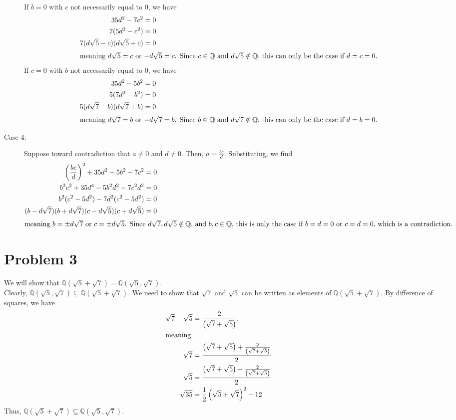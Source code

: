 \documentclass[11pt]{extarticle}
\newcommand{\Q}{\mathbb{Q}}
\begin{document}
\begin{description}
      If $b = 0$ with $c$ not necessarily equal to $0$, we have
      \begin{align*}
        35d^2 - 7c^2 &= 0\\
        7(5d^2 - c^2) &= 0\\
        7(d\sqrt{5} - c)(d\sqrt{5} + c) &= 0\\
        \intertext{meaning $d\sqrt{5} = c$ or $-d\sqrt{5} = c$. Since $c\in\Q$ and $d\sqrt{5}\notin \Q$, this can only be the case if $d=c=0$.}
      \end{align*}
      If $c = 0$ with $b$ not necessarily equal to $0$, we have
      \begin{align*}
        35d^2 - 5b^2 &= 0\\
        5(7d^2 - b^2) &= 0\\
        5(d\sqrt{7} - b)(d\sqrt{7} + b) &= 0\\
        \intertext{meaning $d\sqrt{7} = b$ or $-d\sqrt{7} = b$. Since $b\in\Q$ and $d\sqrt{7}\notin \Q$, this can only be the case if $d=b=0$.}
      \end{align*}
    \item[Case 4:] Suppose toward contradiction that $a\neq 0$ and $d\neq 0$. Then, $a = \frac{bc}{d}$. Substituting, we find
      \begin{align*}
        \left(\frac{bc}{d}\right)^2 + 35d^2 - 5b^2 - 7c^2 &= 0\\
        b^2c^2 + 35d^4 - 5b^2d^2 - 7c^2d^2 &= 0\\
        b^2(c^2 - 5d^2) - 7d^2(c^2 - 5d^2) &= 0\\
        (b-d\sqrt{7})(b+d\sqrt{7})(c-d\sqrt{5})(c+d\sqrt{5}) &= 0\\
        \intertext{meaning $b = \pm d\sqrt{7}$ or $c = \pm d\sqrt{5}$. Since $d\sqrt{7},d\sqrt{5}\notin \Q$, and $b,c\in\Q$, this is only the case if $b=d=0$ or $c=d=0$, which is a contradiction.}
      \end{align*}
  \end{description}
  \section{Problem 3}%
  We will show that $\Q(\sqrt{5} + \sqrt{7}) = \Q(\sqrt{5},\sqrt{7})$.\\

  Clearly, $\Q(\sqrt{5},\sqrt{7})\subseteq \Q(\sqrt{5} + \sqrt{7})$. We need to show that $\sqrt{7}$ and $\sqrt{5}$ can be written as elements of $\Q(\sqrt{5} + \sqrt{7})$. By difference of squares, we have
  \begin{align*}
    \sqrt{7} - \sqrt{5} &= \frac{2}{\left(\sqrt{7} + \sqrt{5}\right)},\\
    \intertext{meaning}
    \sqrt{7} &= \frac{\left(\sqrt{7} + \sqrt{5}\right) + \frac{2}{\left(\sqrt{7} + \sqrt{5}\right)}}{2}\\
    \sqrt{5} &= \frac{\left(\sqrt{7} + \sqrt{5}\right) - \frac{2}{\left(\sqrt{7} + \sqrt{5}\right)}}{2}\\
    \sqrt{35} &= \frac{1}{2}\left(\sqrt{5} + \sqrt{7}\right)^2 - 12
  \end{align*}
  Thus, $\Q(\sqrt{5} + \sqrt{7})\subseteq \Q(\sqrt{5},\sqrt{7})$.
\end{document}
